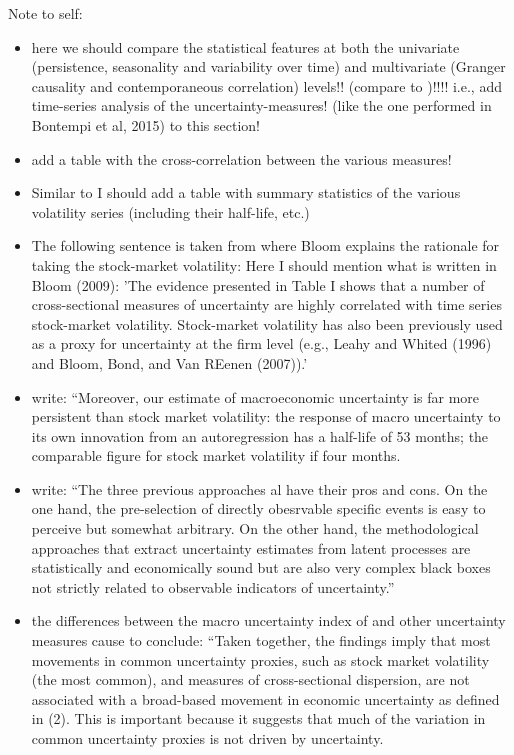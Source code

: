 \documentclass[a4paper,12pt,oneside,pointednumbers,bibtotoc,bigheadings,liststotoc]{scrbook}
\begin{document}
\begingroup
    \fontsize{8pt}{12pt}\selectfont
    Note to self:
\begin{itemize}
	\item here we should compare the statistical features at both the univariate (persistence, seasonality and variability over time) and multivariate (Granger causality and contemporaneous correlation) levels!! (compare to \citet{bontempietal:16})!!!! i.e., add time-series analysis of the uncertainty-measures! (like the one performed in Bontempi et al, 2015) to this section!
	\item add a table with the cross-correlation between the various measures!
	\item Similar to \citet{juradoetal:15} I should add a table with summary statistics of the various volatility series (including their half-life, etc.)
	\item The following sentence is taken from \citet{bloom:09} where Bloom explains the rationale for taking the stock-market volatility: Here I should mention what is written in Bloom (2009): 'The evidence presented in Table I shows that a number of cross-sectional measures of uncertainty are highly correlated with time series stock-market volatility. Stock-market volatility has also been previously used as a proxy for uncertainty at the firm level (e.g., Leahy and Whited (1996) and Bloom, Bond, and Van REenen (2007)).'
	\item \citet[p. 1180]{juradoetal:15} write: ``Moreover, our estimate of macroeconomic uncertainty is far more persistent than stock market volatility: the response of macro uncertainty to its own innovation from an autoregression has a half-life of 53 months; the comparable figure for stock market volatility if four months.
	\item \citet[p. 3]{bontempietal:16} write: ``The three previous approaches al have their pros and cons. On the one hand, the pre-selection of directly obesrvable specific events is easy to perceive but somewhat arbitrary. On the other hand, the methodological approaches that extract uncertainty estimates from latent processes are statistically and economically sound but are also very complex black boxes not strictly related to observable indicators of uncertainty.''
	\item the differences between the macro uncertainty index of \citet{juradoetal:15} and other uncertainty measures cause \citet[p. 1180]{juradoetal:15} to conclude: ``Taken together, the findings imply that most movements in common uncertainty proxies, such as stock market volatility (the most common), and measures of cross-sectional dispersion, are not associated with a broad-based movement in economic uncertainty as defined in (2). This is important because it suggests that much of the variation in common uncertainty proxies is not driven by uncertainty.
\end{itemize}
\endgroup
\end{document}

